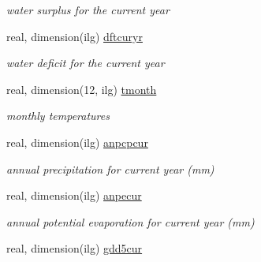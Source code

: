 \begin{DoxyCompactItemize}
\begin{DoxyCompactList}\small\item\em water surplus for the current year \end{DoxyCompactList}\item 
\hypertarget{structctem__statevars_1_1veg__gat_a79f05ab8e3d322fd2e7640757977e559}{}real, dimension(ilg) \hyperlink{structctem__statevars_1_1veg__gat_a79f05ab8e3d322fd2e7640757977e559}{dftcuryr}\label{structctem__statevars_1_1veg__gat_a79f05ab8e3d322fd2e7640757977e559}

\begin{DoxyCompactList}\small\item\em water deficit for the current year \end{DoxyCompactList}\item 
\hypertarget{structctem__statevars_1_1veg__gat_ad7b9efddabefa1005c1edad19474fa46}{}real, dimension(12, ilg) \hyperlink{structctem__statevars_1_1veg__gat_ad7b9efddabefa1005c1edad19474fa46}{tmonth}\label{structctem__statevars_1_1veg__gat_ad7b9efddabefa1005c1edad19474fa46}

\begin{DoxyCompactList}\small\item\em monthly temperatures \end{DoxyCompactList}\item 
\hypertarget{structctem__statevars_1_1veg__gat_a223d4104c23ffc72b2d93c8becab8342}{}real, dimension(ilg) \hyperlink{structctem__statevars_1_1veg__gat_a223d4104c23ffc72b2d93c8becab8342}{anpcpcur}\label{structctem__statevars_1_1veg__gat_a223d4104c23ffc72b2d93c8becab8342}

\begin{DoxyCompactList}\small\item\em annual precipitation for current year (mm) \end{DoxyCompactList}\item 
\hypertarget{structctem__statevars_1_1veg__gat_a17bc486047d5649ac1491acf9b02e960}{}real, dimension(ilg) \hyperlink{structctem__statevars_1_1veg__gat_a17bc486047d5649ac1491acf9b02e960}{anpecur}\label{structctem__statevars_1_1veg__gat_a17bc486047d5649ac1491acf9b02e960}

\begin{DoxyCompactList}\small\item\em annual potential evaporation for current year (mm) \end{DoxyCompactList}\item 
\hypertarget{structctem__statevars_1_1veg__gat_afc7666a6ba90e49d22d3385ce95a33d2}{}real, dimension(ilg) \hyperlink{structctem__statevars_1_1veg__gat_afc7666a6ba90e49d22d3385ce95a33d2}{gdd5cur}\label{structctem__statevars_1_1veg__gat_afc7666a6ba90e49d22d3385ce95a33d2}


\end{DoxyCompactItemize}
